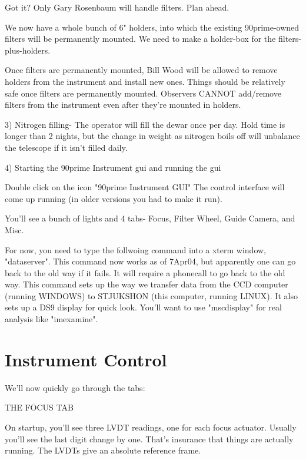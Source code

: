 \documentclass[letterpaper,12pt]{article}
\begin{document}
   Got it? Only Gary Rosenbaum will handle filters. Plan ahead.

   We now have a whole bunch of 6" holders, into which the existing
   90prime-owned filters will be permanently mounted. We need to
   make a holder-box for the filters-plus-holders. 

   Once filters are permanently mounted, Bill Wood will be allowed
   to remove holders from the instrument and install new ones.
   Things should be relatively safe once filters are permanently
   mounted. Observers CANNOT add/remove filters from the
   instrument even after they're mounted in holders.

3) Nitrogen filling- The operator will fill the dewar once per day.
   Hold time is longer than 2 nights, but the change in weight
   as nitrogen boils off will unbalance the telescope if it
   isn't filled daily.

4) Starting the 90prime Instrument gui and running the gui

      Double click on the icon "90prime Instrument GUI"
      The control interface will come up running (in older versions
      you had to make it run).

      You'll see a bunch of lights and 4 tabs- Focus, Filter Wheel,
      Guide Camera, and Misc.

      For now, you need to type the follwoing command into a xterm
      window, "dataserver". This command now works as of 7Apr04, but
      apparently one can go back to the old way if it fails. It
      will require a phonecall to go back to the old way.
      This command sets up the way we transfer data from the CCD computer
      (running WINDOWS) to STJUKSHON (this computer, running LINUX).
      It also sets up a DS9 display for quick look. You'll
      want to use "mscdisplay" for real analysis like "imexamine".

\section{Instrument Control}

      We'll now quickly go through the tabs:

       THE FOCUS TAB

         On startup, you'll see three LVDT readings, one for each
         focus actuator. Usually you'll see the last digit change
         by one. That's insurance that things are actually running.
         The LVDTs give an absolute reference frame.
\end{document}
